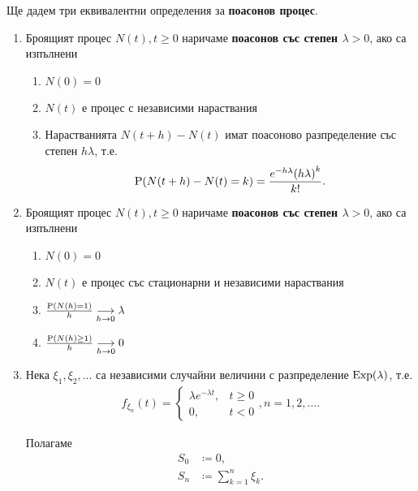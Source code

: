 \documentclass[numbers=endperiod, bibliography=totocnumbered]{scrartcl}
\begin{document}
\begin{definition}
  Ще дадем три еквивалентни определения за \textbf{поасонов процес}.

  \begin{enumerate}
    \item\label{def:poisson_process/increments} Броящият процес \( N(t), t \geq 0 \) наричаме \textbf{поасонов със степен \( \lambda > 0 \)}, ако са изпълнени
    \begin{enumerate}
      \item \( N(0) = 0 \)
      \item \( N(t) \) е процес с независими нараствания
      \item Нарастванията \( N(t+h)-N(t) \) имат поасоново разпределение със степен \( h\lambda \), т.е.
      \begin{align*}
        \Prob(N(t+h)-N(t) = k)
        =
        \frac{e^{-h\lambda} {(h\lambda)}^k} {k!}.
      \end{align*}
    \end{enumerate}

    \item\label{def:poisson_process/limits} Броящият процес \( N(t), t \geq 0 \) наричаме \textbf{поасонов със степен \( \lambda > 0 \)}, ако са изпълнени
    \begin{enumerate}
      \item \( N(0) = 0 \)
      \item \( N(t) \) е процес със стационарни и независими нараствания
      \item \( \frac {\Prob(N(h) = 1)} h \Conv[h \to 0]{} \lambda \)
      \item \( \frac {\Prob(N(h) \geq 1)} h \Conv[h \to 0]{} 0 \)
    \end{enumerate}

    \item\label{def:poisson_process/waiting_times} Нека \( \xi_1, \xi_2, \ldots \) са независими случайни величини с разпределение \( \DExp(\lambda) \), т.е.
    \begin{align*}
      f_{\xi_n}(t) =
      \begin{cases}
        \lambda e^{-\lambda t}, &t \geq 0 \\
        0, &t < 0
      \end{cases},
      n = 1, 2, \ldots.
    \end{align*}

    Полагаме
    \begin{align*}
      S_0 &\coloneqq 0, \\
      S_n &\coloneqq \sum_{k=1}^n \xi_k.
    \end{align*}


\end{enumerate}
\end{definition}
\end{document}
